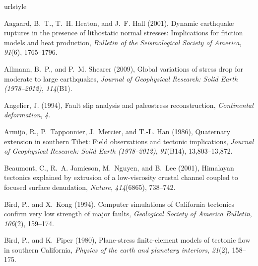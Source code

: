 \documentclass[twocolumn,jgrga]{AGUTeX}
\begin{document}
\begin{article}
{{\begin{thebibliography}{87}
\providecommand{\natexlab}[1]{#1}
\expandafter\ifx\csname urlstyle\endcsname\relax
  \providecommand{\doi}[1]{doi:\discretionary{}{}{}#1}\else
  \providecommand{\doi}{doi:\discretionary{}{}{}\begingroup
  \urlstyle{rm}\Url}\fi

Aagaard, B.~T., T.~H. Heaton, and J.~F. Hall (2001), Dynamic earthquake
  ruptures in the presence of lithostatic normal stresses: {I}mplications for
  friction models and heat production, \textit{Bulletin of the Seismological
  Society of America}, \textit{91}(6), 1765--1796.

Allmann, B.~P., and P.~M. Shearer (2009), Global variations of stress drop for
  moderate to large earthquakes, \textit{Journal of Geophysical Research: Solid
  Earth (1978--2012)}, \textit{114}(B1).

Angelier, J. (1994), Fault slip analysis and paleostress reconstruction,
  \textit{Continental deformation}, \textit{4}.

Armijo, R., P.~Tapponnier, J.~Mercier, and T.-L. Han (1986), Quaternary
  extension in southern {T}ibet: {F}ield observations and tectonic
  implications, \textit{Journal of Geophysical Research: Solid Earth
  (1978--2012)}, \textit{91}(B14), 13,803--13,872.

Beaumont, C., R.~A. Jamieson, M.~Nguyen, and B.~Lee (2001), Himalayan tectonics
  explained by extrusion of a low-viscosity crustal channel coupled to focused
  surface denudation, \textit{Nature}, \textit{414}(6865), 738--742.

Bird, P., and X.~Kong (1994), Computer simulations of {C}alifornia tectonics
  confirm very low strength of major faults, \textit{Geological Society of
  America Bulletin}, \textit{106}(2), 159--174.

Bird, P., and K.~Piper (1980), Plane-stress finite-element models of tectonic
  flow in southern {C}alifornia, \textit{Physics of the earth and planetary
  interiors}, \textit{21}(2), 158--175.


\end{thebibliography}}}
\end{article}
\end{document}
